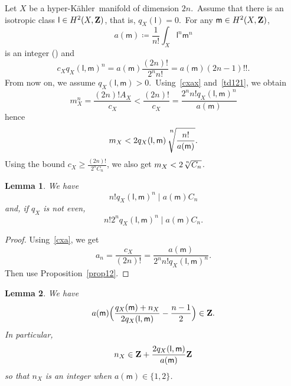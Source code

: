 \documentclass[12pt]{amsart}
\def\Z{{\bf Z}}
\def\hk{hyper-K\"ahler}
\newtheorem{lemm}{Lemma}[section]
\theoremstyle{remark}
\def\lll{\ensuremath{\mathsf l}}
\def\mm{\ensuremath{\mathsf m}}
\begin{document}
 Let $X$ be a \hk\ manifold of dimension $2n$.\   Assume that there is an isotropic class $\lll\in H^2(X,\Z)$, that is, $q_X(\lll)=0$.\ For any   
  $ \mm\in H^2(X,\Z)$,
 $$a(\mm)\coloneqq\frac{1}{n!}\int_X\lll^n\mm^n$$
 is an integer (\cite[Lemma~2.2]{dhmv}) and 
\begin{equation} \label{cxa}
c_Xq_X(\lll,\mm)^n=a(\mm)\frac{(2n)!}{2^nn!}=a(\mm)(2n-1)!!.
\end{equation}
From now on, we assume $q_X(\lll,\mm)>0$.\ Using~\eqref{cxax} and~\eqref{td121}, we obtain
$$
m_X^n =\frac{(2n)!A_X}{c_X}<\frac{(2n)! }{c_X} = \frac{ 2^nn!q_X(\lll,\mm)^n}{a(\mm) }$$
hence
\begin{equation}\label{mxroot}
m_X < 2q_X(\lll,\mm) \sqrt[\leftroot{-3}\uproot{16}  {\scriptstyle {n}}]{\frac{  n!}{a(\mm) }}.
\end{equation}
 Using the bound $c_X\ge \frac{(2n)!}{2^nC_n}$, we also get $m_X< 2 \sqrt[\leftroot{-1}\uproot{2} n]{C_n}$.

\begin{lemm}\label{le1}
We have
$$
n! q_X(\lll,\mm)^n \mid a(\mm)C_n$$
and,  if $q_X$ is not even,
$$n! 2^n q_X(\lll,\mm)^n \mid a(\mm)C_n.$$

\end{lemm}


\begin{proof}
Using~\eqref{cxa}, we get
$$
a_n= \frac{c_X}{(2n)!} =\frac{a(\mm)}{2^nn!q_X(\lll,\mm)^n}.
$$
Then use Proposition~\ref{prop12}.\end{proof}

\begin{lemm}\label{le2}
 We have 
\begin{equation*}\label{eq}
a(\mm) \Bigl( \frac{q_X(\mm)+n_X}{2q_X(\lll,\mm)  }-\frac{n-1}2   \Bigr)     \in \Z.
\end{equation*}
In particular,
$$n_X\in   \Z+ \frac{2q_X(\lll,\mm) }{a(\mm)}\Z $$
so that $n_X $ is an integer when $ a(\mm)\in \{1,2\}$.
\end{lemm}
\end{document}
